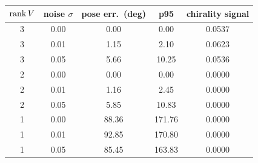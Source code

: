 \begin{tabular}{ccccc}
\toprule
$\operatorname{rank} V$ & noise $\sigma$ & pose err.\ (deg) & p95 & chirality signal \\
\midrule
  3 & 0.00 & 0.00 & 0.00 & 0.0537 \\
  3 & 0.01 & 1.15 & 2.10 & 0.0623 \\
  3 & 0.05 & 5.66 & 10.25 & 0.0536 \\
  2 & 0.00 & 0.00 & 0.00 & 0.0000 \\
  2 & 0.01 & 1.16 & 2.45 & 0.0000 \\
  2 & 0.05 & 5.85 & 10.83 & 0.0000 \\
  1 & 0.00 & 88.36 & 171.76 & 0.0000 \\
  1 & 0.01 & 92.85 & 170.80 & 0.0000 \\
  1 & 0.05 & 85.45 & 163.83 & 0.0000 \\
\bottomrule
\end{tabular}